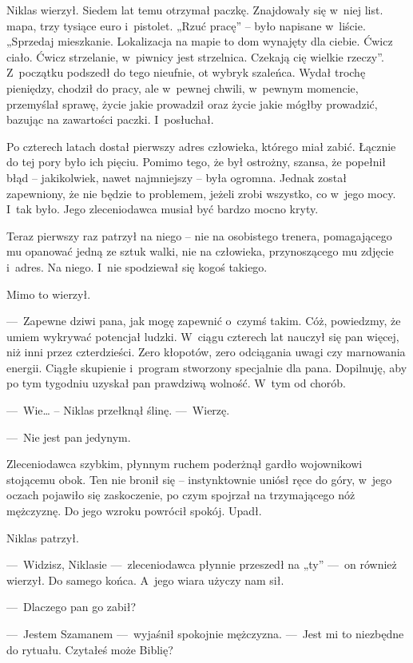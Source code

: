 Niklas wierzył. Siedem lat temu otrzymał paczkę. Znajdowały się w~niej list. mapa, trzy tysiące euro i~pistolet. „Rzuć pracę” -- było napisane w~liście. „Sprzedaj mieszkanie. Lokalizacja na mapie to dom wynajęty dla ciebie. Ćwicz ciało. Ćwicz strzelanie, w~piwnicy jest strzelnica. Czekają cię wielkie rzeczy”. Z~początku podszedł do tego nieufnie, ot wybryk szaleńca. Wydał trochę pieniędzy, chodził do pracy, ale w~pewnej chwili, w~pewnym momencie, przemyślał sprawę, życie jakie prowadził oraz życie jakie mógłby prowadzić, bazując na zawartości paczki. I~posłuchał.

Po czterech latach dostał pierwszy adres człowieka, którego miał zabić. Łącznie do tej pory było ich pięciu. Pomimo tego, że był ostrożny, szansa, że popełnił błąd -- jakikolwiek, nawet najmniejszy -- była ogromna. Jednak został zapewniony, że nie będzie to problemem, jeżeli zrobi wszystko, co w~jego mocy. I~tak było. Jego zleceniodawca musiał być bardzo mocno kryty.

Teraz pierwszy raz patrzył na niego -- nie na osobistego trenera, pomagającego mu opanować jedną ze sztuk walki, nie na człowieka, przynoszącego mu zdjęcie i~adres. Na niego. I~nie spodziewał się kogoś takiego.

Mimo to wierzył.

---~Zapewne dziwi pana, jak mogę zapewnić o~czymś takim. Cóż, powiedzmy, że umiem wykrywać potencjał ludzki. W~ciągu czterech lat nauczył się pan więcej, niż inni przez czterdzieści. Zero kłopotów, zero odciągania uwagi czy marnowania energii. Ciągłe skupienie i~program stworzony specjalnie dla pana. Dopilnuję, aby po tym tygodniu uzyskał pan prawdziwą wolność. W~tym od chorób. 

---~Wie… – Niklas przełknął ślinę. ---~Wierzę.

---~Nie jest pan jedynym. 

Zleceniodawca szybkim, płynnym ruchem poderżnął gardło wojownikowi stojącemu obok. Ten nie bronił się -- instynktownie uniósł ręce do góry, w~jego oczach pojawiło się zaskoczenie, po czym spojrzał na trzymającego nóż mężczyznę. Do jego wzroku powrócił spokój. Upadł.

Niklas patrzył.

---~Widzisz, Niklasie ---~zleceniodawca płynnie przeszedł na „ty” ---~on również wierzył. Do samego końca. A~jego wiara użyczy nam sił. 

---~Dlaczego pan go zabił?

---~Jestem Szamanem ---~wyjaśnił spokojnie mężczyzna. ---~Jest mi to niezbędne do rytuału. Czytałeś może Biblię?

